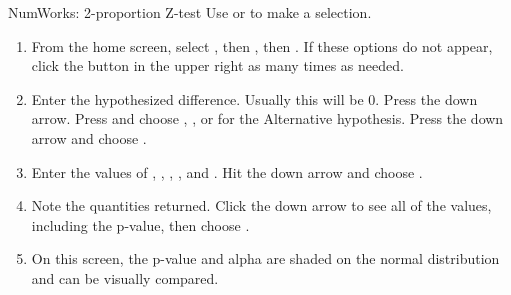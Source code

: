 \begin{onebox}{NumWorks: 2-proportion Z-test}
\label{normalnumworks}
Use  or  to make a selection.
\begin{enumerate}
\setlength{\itemsep}{0mm}
\item From the home screen, select , then , then .  If these options do not appear, click the \calcbutton{$\lhookleftarrow$} button in the upper right as many times as needed. 
\item  Enter the hypothesized difference.  Usually this will be 0.  Press the down arrow.  Press  and choose \calctext{$<$}, \calctext{$\ne$} , or \calctext{$>$}  for the Alternative hypothesis.  Press the down arrow and choose . 
\item Enter the values of , , , , and \calctext{$\alpha$}.  Hit the down arrow and choose . 
\item Note the quantities returned.  Click the down arrow to see all of the values, including the p-value, then choose .
\item On this screen, the p-value and alpha are shaded on the normal distribution and can be visually compared.
\begin{center}
\hspace{10mm}
\end{center}
\vspace{-1.5mm}
\end{enumerate}
\end{onebox}

